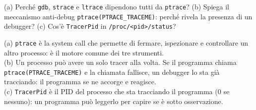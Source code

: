 \question[5]
(a) Perché \lstinline|gdb|, \lstinline|strace| e \lstinline|ltrace| dipendono tutti da \lstinline|ptrace|?
(b) Spiega il meccanismo anti-debug \lstinline|ptrace(PTRACE_TRACEME)|: perché rivela la presenza di un debugger?
(c) Cos'è \lstinline|TracerPid| in \lstinline|/proc/<pid>/status|?
\begin{solution}
(a) \lstinline|ptrace| è la system call che permette di fermare, ispezionare e controllare un altro processo: è il motore comune dei tre strumenti.\\
(b) Un processo può avere un solo tracer alla volta. Se il programma chiama \lstinline|ptrace(PTRACE_TRACEME)| e la chiamata fallisce, un debugger lo sta già tracciando: il programma se ne accorge e reagisce.\\
(c) \lstinline|TracerPid| è il PID del processo che sta tracciando il programma (0 se nessuno): un programma può leggerlo per capire se è sotto osservazione.
\end{solution}
